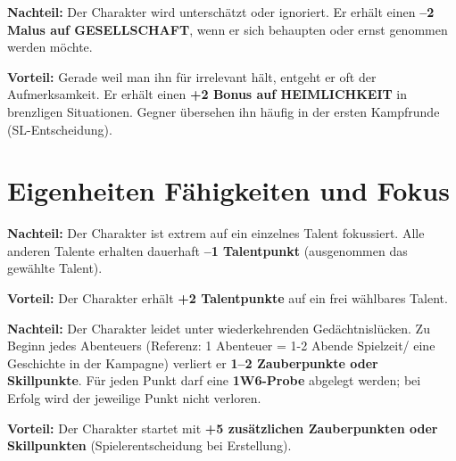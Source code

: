\begin{traitbox}{}
	
	\textbf{Nachteil:}  
	Der Charakter wird unterschätzt oder ignoriert.
	Er erhält einen \textbf{–2 Malus auf GESELLSCHAFT},
	wenn er sich behaupten oder ernst genommen werden möchte.
	
	\medskip
	\textbf{Vorteil:}  
	Gerade weil man ihn für irrelevant hält, entgeht er oft der Aufmerksamkeit.
	Er erhält einen \textbf{+2 Bonus auf HEIMLICHKEIT}
	in brenzligen Situationen.
	Gegner übersehen ihn häufig in der ersten Kampfrunde
	(SL-Entscheidung).
	
\end{traitbox}

\section{Eigenheiten Fähigkeiten und Fokus}

\begin{traitbox}{}
	
	\textbf{Nachteil:}  
	Der Charakter ist extrem auf ein einzelnes Talent fokussiert.
	Alle anderen Talente erhalten dauerhaft \textbf{–1 Talentpunkt}
	(ausgenommen das gewählte Talent).
	
	\medskip
	\textbf{Vorteil:}  
	Der Charakter erhält \textbf{+2 Talentpunkte}
	auf ein frei wählbares Talent.
	
\end{traitbox}

\begin{traitbox}{}
	
	\textbf{Nachteil:}  
	Der Charakter leidet unter wiederkehrenden Gedächtnislücken.
	Zu Beginn jedes Abenteuers (Referenz: 1 Abenteuer = 1-2 Abende Spielzeit/ eine Geschichte in der Kampagne)
	verliert er \textbf{1–2 Zauberpunkte oder Skillpunkte}.
	Für jeden Punkt darf eine \textbf{1W6-Probe} abgelegt werden;
	bei Erfolg wird der jeweilige Punkt nicht verloren.
	
	\medskip
	\textbf{Vorteil:}  
	Der Charakter startet mit \textbf{+5 zusätzlichen Zauberpunkten oder Skillpunkten}
	(Spielerentscheidung bei Erstellung).
	
\end{traitbox}

